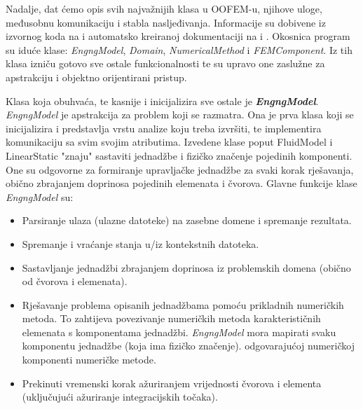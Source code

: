 \documentclass[a4paper,twoside,12pt]{memoir} %
\begin{document}
Nadalje, dat ćemo opis svih najvažnijih klasa u OOFEM-u, njihove uloge, međusobnu komunikaciju i stabla nasljeđivanja. Informacije su dobivene iz izvornog koda na \cite{oofem_github} i automatsko kreiranoj dokumentaciji na \cite{oofem_reference} i \cite{oofem_programmer}. Okosnica program su iduće klase: \textit{EngngModel}, \textit{Domain}, \textit{NumericalMethod} i \textit{FEMComponent}. Iz tih klasa izniču gotovo sve ostale funkcionalnosti te su upravo one zaslužne za apstrakciju i objektno orijentirani pristup. \par

Klasa koja obuhvaća, te kasnije i inicijalizira sve ostale je \textbf{\textit{EngngModel}}. \textit{EngngModel} je apstrakcija za problem koji se razmatra. Ona je prva klasa koji se inicijalizira i predstavlja vrstu analize koju treba izvršiti, te implementira komunikaciju sa svim svojim atributima. Izvedene klase poput FluidModel i LinearStatic "znaju" sastaviti jednadžbe i fizičko značenje pojedinih komponenti. One su odgovorne za formiranje upravljačke jednadžbe za svaki korak rješavanja, obično zbrajanjem doprinosa pojedinih elemenata i čvorova. Glavne funkcije klase \textit{EngngModel} su:
\begin{itemize}
    \item Parsiranje ulaza (ulazne datoteke) na zasebne domene i spremanje rezultata.
    \item Spremanje i vraćanje stanja u/iz kontekstnih datoteka.
    \item Sastavljanje jednadžbi zbrajanjem doprinosa iz problemskih domena (obično od čvorova i elemenata).
    \item Rješavanje problema opisanih jednadžbama pomoću prikladnih numeričkih metoda. To zahtijeva povezivanje numeričkih metoda karakterističnih elemenata s komponentama jednadžbi. \textit{EngngModel} mora mapirati svaku komponentu jednadžbe (koja ima fizičko značenje). odgovarajućoj numeričkoj komponenti numeričke metode.
    \item Prekinuti vremenski korak ažuriranjem vrijednosti čvorova i elementa (uključujući ažuriranje integracijskih točaka).
\end{itemize}
\end{document}
